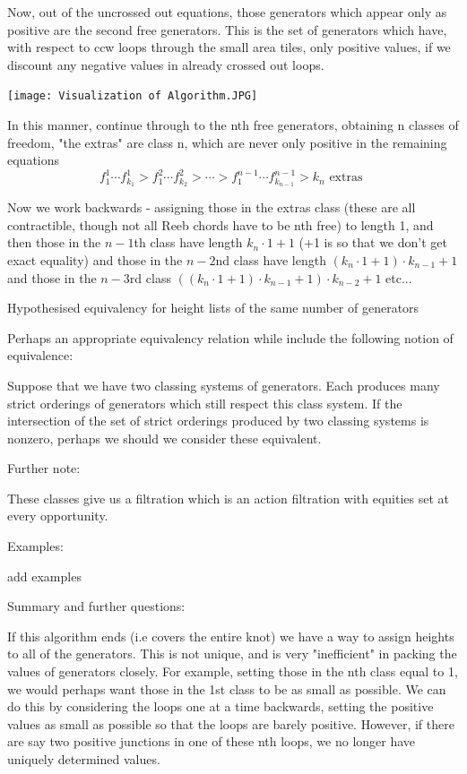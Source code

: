 \documentclass[11pt]{amsart}
\begin{document}
Now, out of the uncrossed out equations, those generators which appear only as positive are the second free generators. This is the set of generators which have, with respect to ccw loops through the small area tiles, only positive values, if we discount any negative values in already crossed out loops. 

\texttt{[image: Visualization of Algorithm.JPG]}

In this manner, continue through to the nth free generators, obtaining n classes of freedom, "the extras" are class n, which are never only positive in the remaining equations
\[f^{1}_1 \cdots f^{1}_{k_1} > f^{2}_1 \cdots f^{2}_{k_2}> \cdots > f^{n-1}_1 \cdots f^{n-1}_{k_{n-1}} > k_n \text{ extras }\]

Now we work backwards - assigning those in the extras class (these are all contractible, though not all Reeb chords have to be nth free) to length 1, and then those in the $n-1$th class have length $k_n \cdot 1 + 1$ (+1 is so that we don't get exact equality) and those in the $n-2$nd class have length $ (k_n \cdot 1 + 1)\cdot k_{n-1} + 1$ and those in the $n-3$rd class $ ((k_n \cdot 1 + 1)\cdot k_{n-1} + 1)\cdot k_{n-2} + 1$ etc...




Hypothesised equivalency for height lists of the same number of generators

Perhaps an appropriate equivalency relation while include the following notion of equivalence:

Suppose that we have two classing systems of generators. Each produces many strict orderings of generators which still respect this class system. If the intersection of the set of strict orderings produced by two classing systems is nonzero, perhaps we should we consider these equivalent.




Further note:

These classes give us a filtration which is an action filtration with equities set at every opportunity. 

Examples:

add examples

Summary and further questions:

If this algorithm ends (i.e covers the entire knot) we have a way to assign heights to all of the generators. This is not unique, and is very "inefficient" in packing the values of generators closely. For example, setting those in the nth class equal to 1, we would perhaps want those in the 1st class to be as small as possible. We can do this by considering the loops one at a time backwards, setting the positive values as small as possible so that the loops are barely positive. However, if there are say two positive junctions in one of these nth loops, we no longer have uniquely determined values. 
\end{document}
